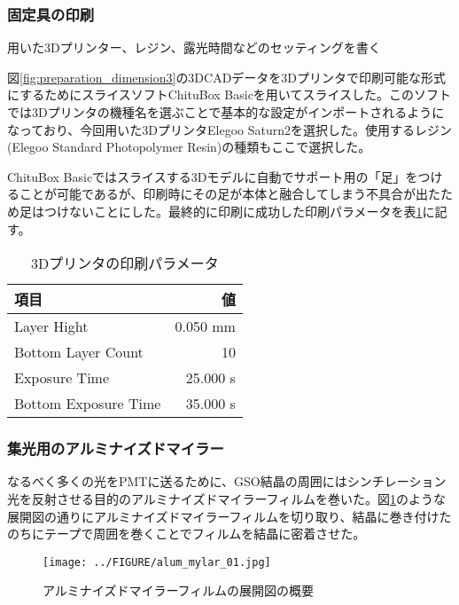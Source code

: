 \documentclass[../../main.tex]{subfiles}
\numberwithin{equation}{section}
\numberwithin{table}{section}
\numberwithin{figure}{section}
\begin{document}
\subsubsection{固定具の印刷}
  用いた3Dプリンター、レジン、露光時間などのセッティングを書く

  図\ref{fig:preparation_dimension3}の3DCADデータを3Dプリンタで印刷可能な形式にするためにスライスソフトChituBox Basicを用いてスライスした。このソフトでは3Dプリンタの機種名を選ぶことで基本的な設定がインポートされるようになっており、今回用いた3DプリンタElegoo Saturn2を選択した。使用するレジン(Elegoo Standard Photopolymer Resin)の種類もここで選択した。

  ChituBox Basicではスライスする3Dモデルに自動でサポート用の「足」をつけることが可能であるが、印刷時にその足が本体と融合してしまう不具合が出たため足はつけないことにした。最終的に印刷に成功した印刷パラメータを表\ref{table:preparation_3Dprinter}に記す。
  \begin{table}[H]
    \begin{center}
      \caption{3Dプリンタの印刷パラメータ}\label{table:preparation_3Dprinter}
     \begin{tabular}{l|r}
       項目 & 値 \\\hline\hline
       Layer Hight & 0.050 \si{\milli\meter}  \\
       Bottom Layer Count & 10 \\
       Exposure Time & 25.000 \si{\second} \\
       Bottom Exposure Time & 35.000 \si{\second}
     \end{tabular}
    \end{center}
   \end{table}

\subsubsection{集光用のアルミナイズドマイラー}
  なるべく多くの光をPMTに送るために、GSO結晶の周囲にはシンチレーション光を反射させる目的のアルミナイズドマイラーフィルムを巻いた。図\ref{fig:preparation_alum_mylar}のような展開図の通りにアルミナイズドマイラーフィルムを切り取り、結晶に巻き付けたのちにテープで周囲を巻くことでフィルムを結晶に密着させた。
  \begin{figure}[H]
    \centering
    \texttt{[image: ../FIGURE/alum\_mylar\_01.jpg]}
    \caption{アルミナイズドマイラーフィルムの展開図の概要}\label{fig:preparation_alum_mylar}
  \end{figure}
\end{document}
